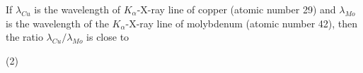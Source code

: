 
\item If \(\lambda_{Cu}\) is the wavelength of \(K_{\alpha}\)-X-ray line of copper (atomic number 29) and \(\lambda_{Mo}\) is the wavelength of the \(K_{\alpha}\)-X-ray line of molybdenum (atomic number 42), then the ratio \(\lambda_{Cu}/\lambda_{Mo}\) is close to
    \begin{tasks}(2)
    \end{tasks}
